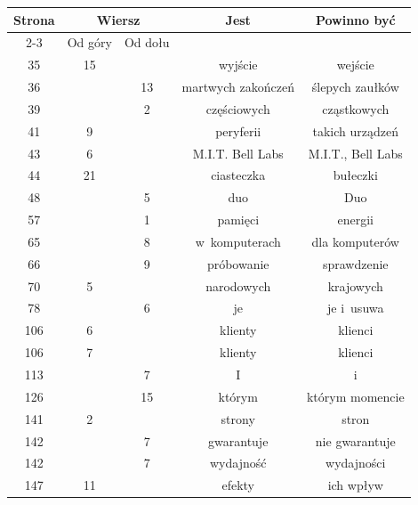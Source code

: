 \documentclass[a4paper,11pt]{article}
\numberwithin{equation}{section}
\begin{document}
\VerSpaceFour



\newpage



\begin{center}

  \begin{tabular}{|c|c|c|c|c|}
    \hline
    Strona & \multicolumn{2}{c|}{Wiersz} & Jest & Powinno być \\ \cline{2-3}
           & Od góry & Od dołu & & \\
    \hline
    \hphantom{0}35 & 15 & & wyjście & wejście \\
    \hphantom{0}36 & & 13 & martwych zakończeń & ślepych zaułków \\
    \hphantom{0}39 & & \hphantom{0}2 & częściowych & cząstkowych \\
    \hphantom{0}41 & \hphantom{0}9 & & peryferii & takich urządzeń \\
    \hphantom{0}43 & \hphantom{0}6 & & M.I.T. Bell Labs
           & M.I.T., Bell Labs \\
    \hphantom{0}44 & 21 & & ciasteczka & bułeczki \\
    \hphantom{0}48 & & \hphantom{0}5 & duo & Duo \\
    \hphantom{0}57 & & \hphantom{0}1 & pamięci & energii \\
    \hphantom{0}65 & & \hphantom{0}8 & w~komputerach & dla komputerów \\
    \hphantom{0}66 & & \hphantom{0}9 & próbowanie & sprawdzenie \\
    \hphantom{0}70 & \hphantom{0}5 & & narodowych & krajowych \\
    \hphantom{0}78 & & \hphantom{0}6 & je & je i~usuwa \\
    106 & \hphantom{0}6 & & klienty & klienci \\
    106 & \hphantom{0}7 & & klienty & klienci \\
    113 & & \hphantom{0}7 & I & i \\
    126 & & 15 & którym & którym momencie \\
    141 & \hphantom{0}2 & & strony & stron \\
    142 & & \hphantom{0}7 & gwarantuje & nie gwarantuje \\
    142 & & \hphantom{0}7 & wydajność & wydajności \\
    147 & 11 & & efekty & ich wpływ \\

\end{tabular}
\end{center}
\end{document}
